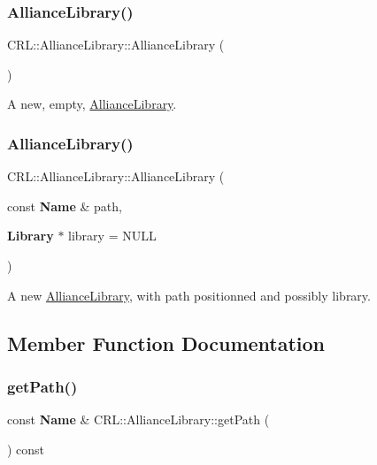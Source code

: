 \subsubsection{\texorpdfstring{Alliance\+Library()}{AllianceLibrary()}\hspace{0.1cm}{\footnotesize\ttfamily [1/2]}}
{\footnotesize\ttfamily C\+R\+L\+::\+Alliance\+Library\+::\+Alliance\+Library (\begin{DoxyParamCaption}{ }\end{DoxyParamCaption})}

A new, empty, \hyperlink{classCRL_1_1AllianceLibrary}{Alliance\+Library}. \mbox{\label{classCRL_1_1AllianceLibrary_a1a0c9a0f2b74eaae859206e5338107a0}} 
\subsubsection{\texorpdfstring{Alliance\+Library()}{AllianceLibrary()}\hspace{0.1cm}{\footnotesize\ttfamily [2/2]}}
{\footnotesize\ttfamily C\+R\+L\+::\+Alliance\+Library\+::\+Alliance\+Library (\begin{DoxyParamCaption}\item[{const \textbf{ Name} \&}]{path,  }\item[{\textbf{ Library} $\ast$}]{library = {\ttfamily NULL} }\end{DoxyParamCaption})}

A new \hyperlink{classCRL_1_1AllianceLibrary}{Alliance\+Library}, with {\ttfamily path} positionned and possibly {\ttfamily library}. 

\subsection{Member Function Documentation}
\mbox{\label{classCRL_1_1AllianceLibrary_a3be21e668a6a01085df037989eacf6f8}} 
\subsubsection{\texorpdfstring{get\+Path()}{getPath()}}
{\footnotesize\ttfamily const \textbf{ Name} \& C\+R\+L\+::\+Alliance\+Library\+::get\+Path (\begin{DoxyParamCaption}{ }\end{DoxyParamCaption}) const\hspace{0.3cm}{\ttfamily [inline]}}

